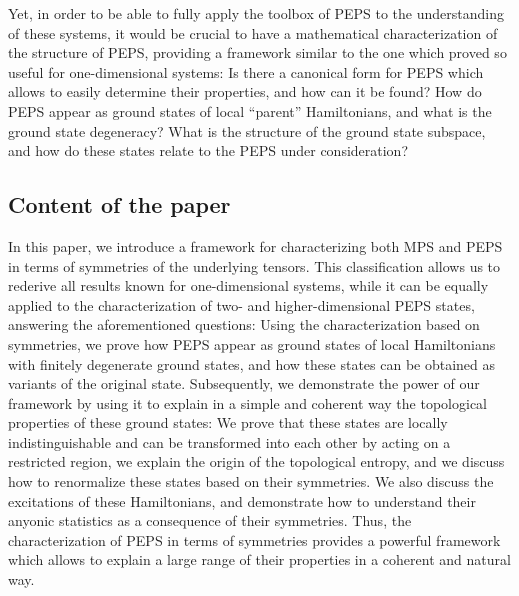 \documentclass{article}
\theoremstyle{plain}
\theoremstyle{definition}
\numberwithin{equation}{section}  %
\begin{document}
Yet, in order to be able to fully apply the toolbox of PEPS to the
understanding of these systems, it would be crucial to have a mathematical
characterization of the structure of PEPS, providing a framework similar
to the one which proved so useful for one-dimensional systems: Is there a
canonical form for PEPS which allows to easily determine their properties,
and how can it be found?  How do PEPS appear as ground states of local
``parent'' Hamiltonians, and what is the ground state degeneracy?
What is the structure of the ground state subspace, and how do these
states relate to the PEPS under consideration?




\subsection{Content of the paper}

In this paper, we introduce a framework for characterizing both MPS and
PEPS in terms of symmetries of the underlying tensors. This classification
allows us to rederive all results known for one-dimensional systems, while
it can be equally applied to the characterization of two- and
higher-dimensional PEPS states, answering the aforementioned
questions:
Using the characterization based on symmetries, we prove how PEPS appear as
ground states of local Hamiltonians with finitely degenerate ground
states, and how these states can be obtained as variants of the original
state. Subsequently, we demonstrate the power of our framework by using it
to explain in a simple and coherent way the topological properties of
these ground states: We prove that these states are locally
indistinguishable and can be transformed into each other by acting on a
restricted region, we explain the origin of the topological entropy, and
we discuss how to renormalize these states based on their symmetries. We
also discuss the excitations of these Hamiltonians, and demonstrate how to
understand their anyonic statistics as a consequence of their symmetries.
Thus, the characterization of PEPS in terms of symmetries provides a
powerful framework which allows to explain a large range of their
properties in a coherent and natural way.
\end{document}
